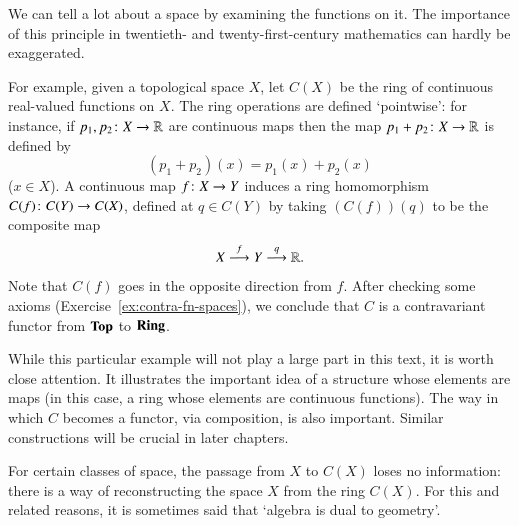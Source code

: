 \begin{example}
\label{eg:contra-fn-spaces}
%
%
%
We can tell a lot about a space by examining the functions on it.  The
importance of this principle in twentieth- and twenty-first-century
mathematics can hardly be exaggerated.

For example, given a topological space $X$, let $C(X)$%
%
%
be the ring of continuous real-valued functions on $X$.  The ring
operations are defined `pointwise':%
%
%
for instance, if $p_1, p_2\from X \to \reals$ are continuous maps then the
map $p_1 + p_2 \from X \to \reals$ is defined by
\[
(p_1 + p_2)(x) = p_1(x) + p_2(x)
\]
($x \in X$).  A continuous map $f\from X \to Y$ induces a ring homomorphism
$C(f)\from C(Y) \to C(X)$, defined at $q \in C(Y)$ by taking $(C(f))(q)$ to be
the composite map
\[
X \stackrel{f}{\longrightarrow} Y \stackrel{q}{\longrightarrow} \mathbb{R}.
\]
Note that $C(f)$ goes in the opposite direction from $f$.  After checking
some axioms (Exercise~\ref{ex:contra-fn-spaces}), we conclude that $C$ is a
contravariant functor from $\mathbf{Top}$ to $\mathbf{Ring}$.

While this particular example will not play a large part in this text, it
is worth close attention.  It illustrates the important idea of a
structure whose elements are maps (in this case, a ring whose elements are
continuous functions).  The way in which $C$ becomes a functor, via
composition, is also important.  Similar constructions will be crucial in
later chapters.

For certain classes of space, the passage from $X$ to $C(X)$ loses no
information: there is a way of reconstructing the space $X$ from the ring
$C(X)$.  For this and related reasons, it is sometimes said that `algebra
is dual%
%
%
to geometry'.
\end{example}


